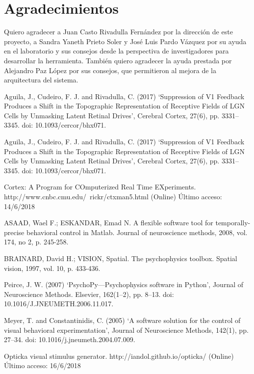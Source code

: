 \documentclass[conference]{IEEEtran}
\begin{document}
\section{Agradecimientos}

Quiero agradecer a Juan Casto Rivadulla Fernández por la dirección de este proyecto, a Sandra Yaneth Prieto Soler y José Luis Pardo Vázquez por su ayuda en el laboratorio y sus consejos desde la perspectiva de investigadores para desarrollar la herramienta. 
También quiero agradecer la ayuda prestada por Alejandro Paz López por sus consejos, que permitieron al mejora de la arquitectura del sistema.

\begin{thebibliography}{00}
 Aguila, J., Cudeiro, F. J. and Rivadulla, C. (2017) ‘Suppression of V1 Feedback Produces a Shift in the Topographic Representation of Receptive Fields of LGN Cells by Unmasking Latent Retinal Drives’, Cerebral Cortex, 27(6), pp. 3331–3345. doi: 10.1093/cercor/bhx071.

 Aguila, J., Cudeiro, F. J. and Rivadulla, C. (2017) ‘Suppression of V1 Feedback Produces a Shift in the Topographic Representation of Receptive Fields of LGN Cells by Unmasking Latent Retinal Drives’, Cerebral Cortex, 27(6), pp. 3331–3345. doi: 10.1093/cercor/bhx071.

 Cortex: A Program for COmputerized Real Time EXperiments. http://www.cnbc.cmu.edu/~rickr/ctxman5.html (Online) Último acceso: 14/6/2018


ASAAD, Wael F.; ESKANDAR, Emad N. A flexible software tool for temporally-precise behavioral control in Matlab. Journal of neuroscience methods, 2008, vol. 174, no 2, p. 245-258.


 BRAINARD, David H.; VISION, Spatial. The psychophysics toolbox. Spatial vision, 1997, vol. 10, p. 433-436.

 Peirce, J. W. (2007) ‘PsychoPy—Psychophysics software in Python’, Journal of Neuroscience Methods. Elsevier, 162(1–2), pp. 8–13. doi: 10.1016/J.JNEUMETH.2006.11.017.

 Meyer, T. and Constantinidis, C. (2005) ‘A software solution for the control of visual behavioral experimentation’, Journal of Neuroscience Methods, 142(1), pp. 27–34. doi: 10.1016/j.jneumeth.2004.07.009.

 Opticka visual stimulus generator. http://iandol.github.io/opticka/ (Online) Último acceso: 16/6/2018



\end{thebibliography}
\end{document}
